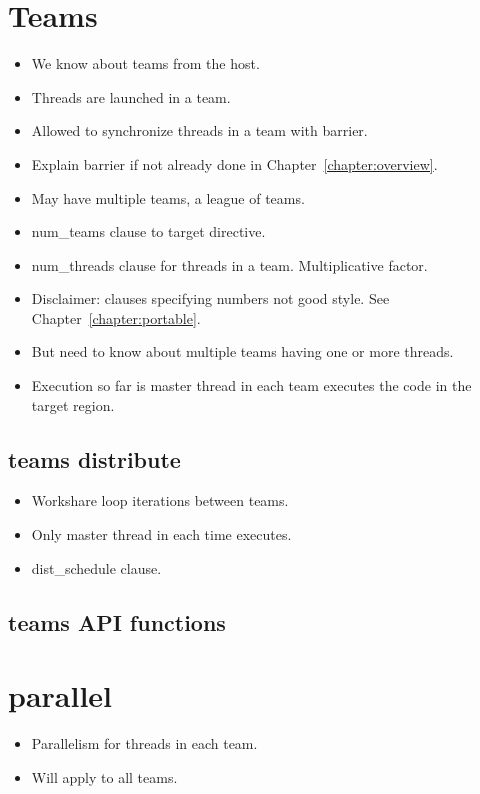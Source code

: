 \section{Teams}
\label{sec:teams}
\begin{itemize}
  \item We know about teams from the host.
  \item Threads are launched in a team.
  \item Allowed to synchronize threads in a team with barrier.
  \item Explain barrier if not already done in Chapter~\ref{chapter:overview}.
  \item May have multiple teams, a league of teams.
  \item num\_teams clause to target directive.
  \item num\_threads clause for threads in a team. Multiplicative factor.
  \item Disclaimer: clauses specifying numbers not good style. See Chapter~\ref{chapter:portable}.
  \item But need to know about multiple teams having one or more threads.
  \item Execution so far is master thread in each team executes the code in the target region.
\end{itemize}

\subsection{teams distribute}
\label{ssec:teams_distribute}
\begin{itemize}
  \item Workshare loop iterations between teams.
  \item Only master thread in each time executes.
  \item dist\_schedule clause.
\end{itemize}


\subsection{teams API functions}
\label{ssec:teams_query_functions}

\section{parallel}
\begin{itemize}
  \item Parallelism for threads in each team.
  \item Will apply to all teams.
\end{itemize}

